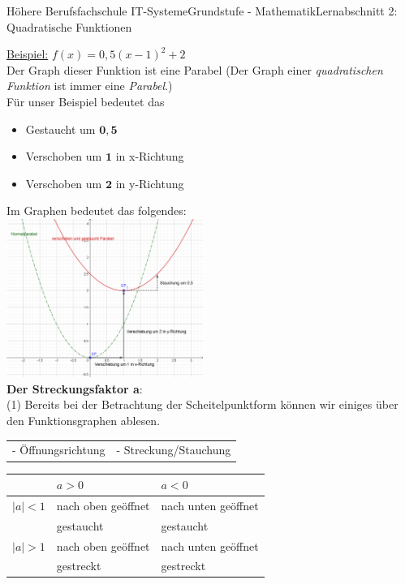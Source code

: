 \documentclass[11pt,twocolumn,oneside,openany,headings=optiontotoc,11pt,numbers=noenddot]{article}
\begin{document}
\begin{worksheet}{Höhere Berufsfachschule IT-Systeme}{Grundstufe - Mathematik}{Lernabschnitt 2: Quadratische Funktionen}
		\par\noindent
		\underline{Beispiel:} \(f(x) = 0,5(x-1)^2 + 2\)\\
		Der Graph dieser Funktion ist eine Parabel (\small{Der Graph einer \textit{quadratischen Funktion} ist immer eine \textit{Parabel}.})\\
		Für unser Beispiel bedeutet das
		\begin{itemize}
			\item Gestaucht um \(\mathbf{0,5}\)
			\item Verschoben um \(\mathbf{1}\) in x-Richtung
			\item Verschoben um \(\mathbf{2}\) in y-Richtung
		\end{itemize}
		Im Graphen bedeutet das folgendes:\\
		\includegraphics[width=0.48\textwidth]{../99_Bilder/SP_Form.png}\\
		\textbf{Der Streckungsfaktor a}:\\
		(1) Bereits bei der Betrachtung der Scheitelpunktform können wir einiges über den Funktionsgraphen ablesen.\\
		\begin{tabularx}{0.5\textwidth}{XX}
			- Öffnungsrichtung & - Streckung/Stauchung
		\end{tabularx}
		\par\noindent
		\begin{tabularx}{0.5\textwidth}{l|l|l}
			\diagbox{\(|a|\)}{\(a\)} & \(a > 0\) & \( a < 0\)\\
			\hline
			\(|a| < 1\) & nach oben geöffnet & nach unten geöffnet\\
			& gestaucht & gestaucht\\
			\hline
			\(|a|> 1\) & nach oben geöffnet & nach unten geöffnet\\
			& gestreckt & gestreckt
		\end{tabularx}\\
		\par\bigskip\noindent
		\begin{tabularx}{0.5\textwidth}{XX}

\end{tabularx}
\end{worksheet}
\end{document}

